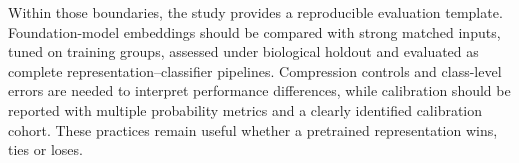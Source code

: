 Within those boundaries, the study provides a reproducible evaluation template. Foundation-model embeddings should be compared with strong matched inputs, tuned on training groups, assessed under biological holdout and evaluated as complete representation--classifier pipelines. Compression controls and class-level errors are needed to interpret performance differences, while calibration should be reported with multiple probability metrics and a clearly identified calibration cohort. These practices remain useful whether a pretrained representation wins, ties or loses.
